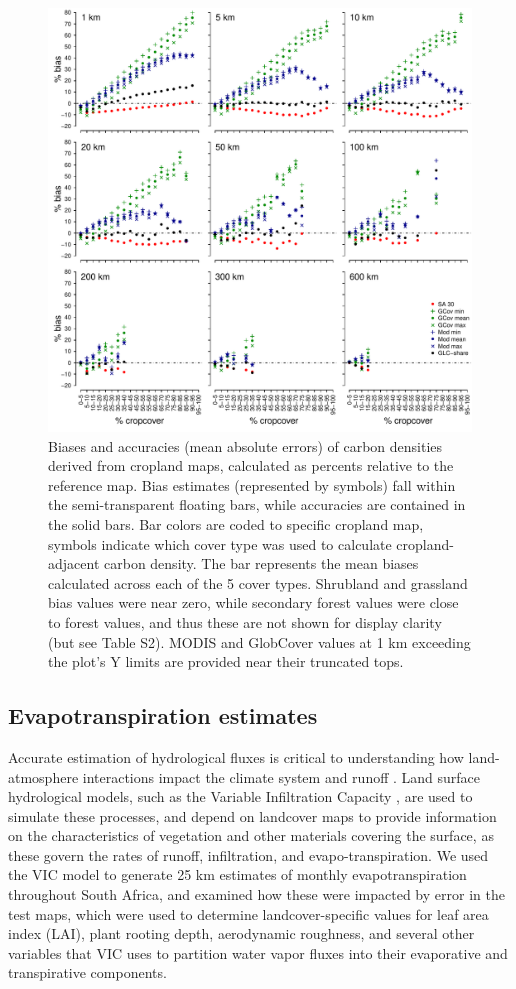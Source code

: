 \documentclass{pnastwo2}
\begin{document}
\begin{article}
\begin{figure}[!h]
\centerline{\includegraphics[width=.5\textwidth]{figures/figure3.pdf}}
\caption{Biases and accuracies (mean absolute errors) of carbon densities derived from cropland maps, calculated as percents relative to the reference map. Bias estimates (represented by symbols) fall within the semi-transparent floating bars, while accuracies are contained in the solid bars. Bar colors are coded to specific cropland map, symbols indicate which cover type was used to calculate cropland-adjacent carbon density. The bar represents the mean biases calculated across each of the 5 cover types. Shrubland and grassland bias values were near zero, while secondary forest values were close to forest values, and thus these are not shown for display clarity (but see Table S2). MODIS and GlobCover values at 1 km exceeding the plot's Y limits are provided near their truncated tops.}
\label{afoto}
\end{figure}

\subsection{Evapotranspiration estimates}
Accurate estimation of hydrological fluxes is critical to understanding how land-atmosphere interactions impact the climate system and runoff \cite{liang_simple_1994}. Land surface hydrological models, such as the Variable Infiltration Capacity \cite{liang_simple_1994}, are used to simulate these processes, and depend on landcover maps to provide information on the characteristics of vegetation and other materials covering the surface, as these govern the rates of runoff, infiltration, and evapo-transpiration. We used the VIC model to generate 25 km estimates of monthly evapotranspiration throughout South Africa, and examined how these were impacted by error in the test maps, which were used to determine landcover-specific values for leaf area index (LAI), plant rooting depth, aerodynamic roughness, and several other variables that VIC uses to partition water vapor fluxes into their evaporative and transpirative components. 


\end{article}
\end{document}
